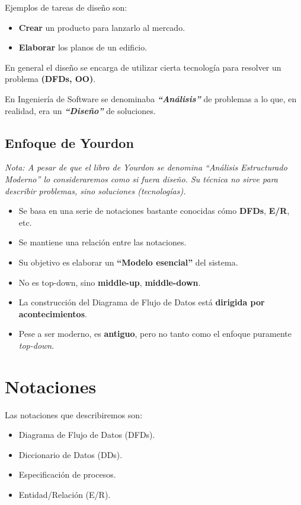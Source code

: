 Ejemplos de tareas de diseño son:

\begin{itemize}[noitemsep]
\item \textbf{Crear} un producto para lanzarlo al mercado.
\item \textbf{Elaborar} los planos de un edificio.
\end{itemize}

En general el diseño se encarga de utilizar cierta tecnología para resolver un problema \textbf{(DFDs, OO)}.

En Ingeniería de Software se denominaba \textit{\textbf{``Análisis''}} de problemas a lo que, en realidad, era un \textit{\textbf{``Diseño''}} de soluciones.

\subsection{Enfoque de Yourdon}
\textit{Nota: A pesar de que el libro de Yourdon se denomina ``Análisis Estructurado Moderno'' lo consideraremos como si fuera diseño. Su técnica no sirve para describir problemas, sino soluciones (tecnologías).}

\begin{itemize}[noitemsep]
\item Se basa en una serie de notaciones bastante conocidas cómo \textbf{DFDs}, \textbf{E/R}, etc.
\item Se mantiene una relación entre las notaciones.
\item Su objetivo es elaborar un \textbf{``Modelo esencial''} del sistema.
\item No es top-down, sino \textbf{middle-up}, \textbf{middle-down}.
\item La construcción del Diagrama de Flujo de Datos está \textbf{dirigida por acontecimientos}.
\item Pese a ser moderno, es \textbf{antiguo}, pero no tanto como el enfoque puramente \textit{top-down}.
\end{itemize}

\section{Notaciones}
Las notaciones que describiremos son:

\begin{itemize}[noitemsep]
\item Diagrama de Flujo de Datos (DFDs).
\item Diccionario de Datos (DDs).
\item Especificación de procesos.
\item Entidad/Relación (E/R).
\end{itemize}

